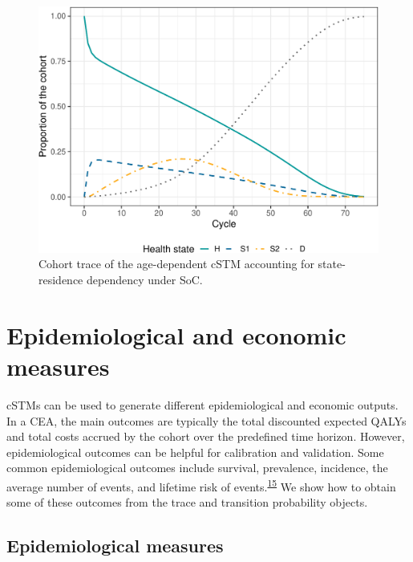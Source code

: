 \documentclass[
]{article}
\begin{document}
\begin{figure}[H]

{\centering \includegraphics{figs/Sick-Sicker-Trace-HistDep-1} 

}

\caption{Cohort trace of the age-dependent cSTM accounting for state-residence dependency under SoC.}\label{fig:Sick-Sicker-Trace-HistDep}
\end{figure}

\hypertarget{epidemiological-and-economic-measures}{%
\section{Epidemiological and economic measures}\label{epidemiological-and-economic-measures}}

cSTMs can be used to generate different epidemiological and economic outputs. In a CEA, the main outcomes are typically the total discounted expected QALYs and total costs accrued by the cohort over the predefined time horizon. However, epidemiological outcomes can be helpful for calibration and validation. Some common epidemiological outcomes include survival, prevalence, incidence, the average number of events, and lifetime risk of events.\textsuperscript{\protect\hyperlink{ref-Siebert2012c}{15}} We show how to obtain some of these outcomes from the trace and transition probability objects.

\hypertarget{epidemiological-measures}{%
\subsection{Epidemiological measures}\label{epidemiological-measures}}
\end{document}
